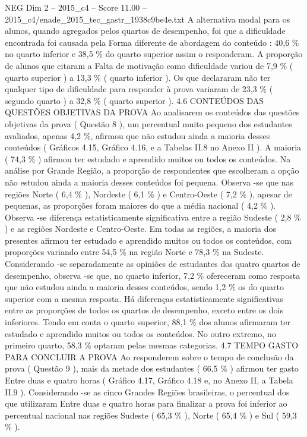 \begin{textsample}{NEG Dim 2 – 2015\_c4 – Score 11.00 – 2015\_c4/enade\_2015\_tec\_gastr\_1938c9be4e.txt}
A alternativa modal para os alunos, quando agregados pelos quartos de desempenho, foi que a dificuldade encontrada foi causada pela Forma diferente de abordagem do conteúdo : 40,6 \% no quarto inferior e 38,5 \% do quarto superior assim o responderam.
A proporção de alunos que citaram a Falta de motivação como dificuldade variou de 7,9 \% ( quarto superior ) a 13,3 \% ( quarto inferior ).
Os que declararam não ter qualquer tipo de dificuldade para responder à prova variaram de 23,3 \% ( segundo quarto ) a 32,8 \% ( quarto superior ). 4.6 CONTEÚDOS DAS QUESTÕES OBJETIVAS DA PROVA Ao analisarem os conteúdos das questões objetivas da prova ( Questão 8 ), um percentual muito pequeno dos estudantes avaliados, apenas 4,2 \%, afirmou que não estudou ainda a maioria desses conteúdos ( Gráficos 4.15, Gráfico 4.16, e a Tabelas II.8 no Anexo II ).
A maioria ( 74,3 \% ) afirmou ter estudado e aprendido muitos ou todos os conteúdos.
Na análise por Grande Região, a proporção de respondentes que escolheram a opção não estudou ainda a maioria desses conteúdos foi pequena.
Observa -se que nas regiões Norte ( 6,4 \% ), Nordeste ( 6,1 \% ) e Centro-Oeste ( 7,2 \% ), apesar de pequenas, as proporções foram maiores do que a média nacional ( 4,2 \% ).
Observa -se diferença estatisticamente significativa entre a região Sudeste ( 2,8 \% ) e as regiões Nordeste e Centro-Oeste.
Em todas as regiões, a maioria dos presentes afirmou ter estudado e aprendido muitos ou todos os conteúdos, com proporções variando entre 54,5 \% na região Norte e 78,3 \% na Sudeste.
Considerando -se separadamente as opiniões de estudantes dos quatro quartos de desempenho, observa -se que, no quarto inferior, 7,2 \% ofereceram como resposta que não estudou ainda a maioria desses conteúdos, sendo 1,2 \% os do quarto superior com a mesma resposta.
Há diferenças estatisticamente significativas entre as proporções de todos os quartos de desempenho, exceto entre os dois inferiores.
Tendo em conta o quarto superior, 88,1 \% dos alunos afirmaram ter estudado e aprendido muitos ou todos os conteúdos.
No outro extremo, no primeiro quarto, 58,3 \% optaram pelas mesmas categorias. 4.7 TEMPO GASTO PARA CONCLUIR A PROVA Ao responderem sobre o tempo de conclusão da prova ( Questão 9 ), mais da metade dos estudantes ( 66,5 \% ) afirmou ter gasto Entre duas e quatro horas ( Gráfico 4.17, Gráfico 4.18 e, no Anexo II, a Tabela II.9 ).
Considerando -se as cinco Grandes Regiões brasileiras, o percentual dos que utilizaram Entre duas e quatro horas para finalizar a prova foi inferior ao percentual nacional nas regiões Sudeste ( 65,3 \% ), Norte ( 65,4 \% ) e Sul ( 59,3 \% ).

\end{textsample}
